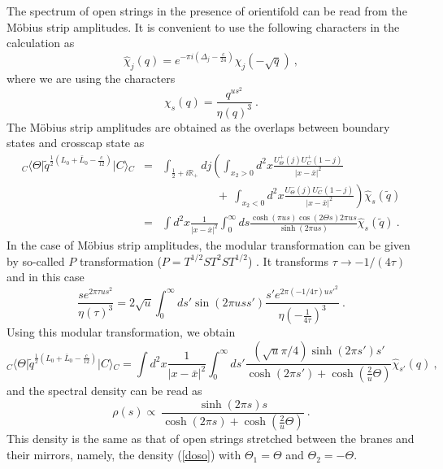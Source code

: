 \documentclass[a4paper,12pt]{article}
\newcommand{\br}{\mathbb R}
\newcommand{\ket}[1]{{|#1\rangle}{}}
\newcommand{\bra}[1]{{\langle#1|}}
\newcommand{\tq}{\tilde{q}}
\newcommand{\nn}{\nonumber\\}
\begin{document}
The spectrum of open strings in the presence of orientifold can be read
from the M\"{o}bius strip amplitudes. It is convenient to use the following
characters \cite{sagnotti1} in the calculation as
\begin{equation}
 \hat{\chi}_j ( q) = 
  e^{- \pi i (\Delta_j - \frac{c}{24})} \chi_j (- \sqrt{q})~,
\end{equation}
where we are using the characters
\begin{equation}
 \chi_s (q) = \frac{q^{us^2}}{\eta(q)^3 } ~.
\end{equation} 
The M\"{o}bius strip amplitudes are obtained as the overlaps between
boundary states and crosscap state as
\begin{eqnarray}
{}_C \bra{\Theta} 
 \tq^{\frac{1}{2}(L_0 + \bar{L}_0 - \frac{c}{12})} 
   \ket{C}_C &=& \int_{\frac{1}{2}+ i \br_+} dj \left(
 \int_{x_2 > 0} d^2 x 
 \frac{U^+_{\Theta} (j) U^+ _{C} (1-j)}{|x-\bar{x}|^2} 
   \right. \nn && \hspace{2cm} +~ \left.
 \int_{x_2 < 0} d^2 x 
 \frac{U^-_{\Theta}(j) U^-_{C} (1-j)}{|x-\bar{x}|^2} 
\right) \hat{\chi}_s (\tq)\nn
&=& \int d^2 x \frac{1}{|x - \bar{x}|^2} \int^{\infty}_0 d s
   \frac{\cosh ( \pi u s) \cos (2  \Theta s) 2 \pi u s}{\sinh (2 \pi u s)}
   \hat{\chi}_s (\tq) ~.
\end{eqnarray} 
In the case of M\"{o}bius strip amplitudes, the modular transformation
can be given by so-called  $P$ transformation ($P = T^{1/2} S T^2 S T^{1/2}$)
\cite{sagnotti1}. It transforms $\tau \to - 1 / (4
\tau)$ and in this case 
\begin{equation}
 \frac{s e^{2 \pi \tau u s^2}}{\eta(\tau)^3 } = 2\sqrt{u} \int ^{\infty} _0
 d s' \sin (2 \pi u s s')   
   \frac{s' e^{2 \pi (- 1 / 4 \tau) u{s'}^2}}{\eta(- \frac{1}{4\tau})^3 } ~.
\label{P-trans}
\end{equation}
Using this modular transformation, we obtain
\begin{equation}
 {}_C \bra{\Theta} 
 \tq^{\frac{1}{2}(L_0 + \bar{L}_0 - \frac{c}{12})} 
   \ket{C}_C =  \int d^2 x \frac{1 }{| x - \bar{x} |^2} 
   \int ^{\infty} _0 d s' \frac{(\sqrt{u} \pi /4) \sinh (2 \pi s')  s'}{
   \cosh (2 \pi s') + \cosh ( \frac{2}{u} \Theta)}
   \hat{\chi}_{s'} (q)~,
\label{MSA}
\end{equation} 
and the spectral density can be read as
\begin{equation}
 \rho (s) \propto  ~ \frac{\sinh (2 \pi s)  s}{
   \cosh (2 \pi s) + \cosh ( \frac{2}{u} \Theta)} ~.
\end{equation}   
This density is the same as that of
open strings stretched between the branes and their mirrors, namely, the
density (\ref{doso}) with $\Theta_1 = \Theta$ and $\Theta_2 = - \Theta$.
\end{document}
